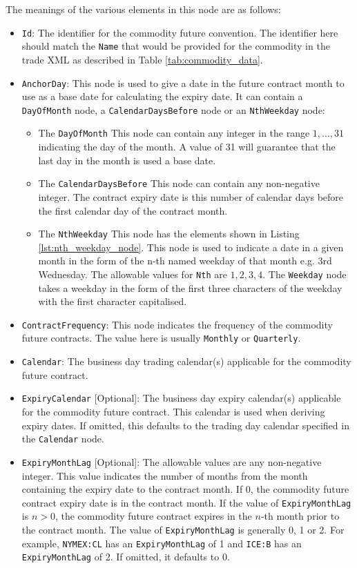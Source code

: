 The meanings of the various elements in this node are as follows:
\begin{itemize}
\item \lstinline!Id!: The identifier for the commodity future convention. The identifier here should match the \lstinline!Name! that would be provided for the commodity in the trade XML as described in Table \ref{tab:commodity_data}.
\item \lstinline!AnchorDay!: This node is used to give a date in the future contract month to use as a base date for calculating the expiry date. It can contain a \lstinline!DayOfMonth! node, a \lstinline!CalendarDaysBefore! node or an \lstinline!NthWeekday! node:
\begin{itemize}
\item The \lstinline!DayOfMonth! This node can contain any integer in the range $1,\ldots,31$ indicating the day of the month. A value of 31 will guarantee that the last day in the month is used a base date.
\item The \lstinline!CalendarDaysBefore! This node can contain any non-negative integer. The contract expiry date is this number of calendar days before the first calendar day of the contract month.
\item The \lstinline!NthWeekday! This node has the elements shown in Listing \ref{lst:nth_weekday_node}. This node is used to indicate a date in a given month in the form of the n-th named weekday of that month e.g. 3rd Wednesday. The allowable values for \lstinline!Nth! are ${1,2,3,4}$. The \lstinline!Weekday! node takes a weekday in the form of the first three characters of the weekday with the first character capitalised.
\end{itemize}
\item \lstinline!ContractFrequency!: This node indicates the frequency of the commodity future contracts. The value here is usually \lstinline!Monthly! or \lstinline!Quarterly!.
\item \lstinline!Calendar!: The business day trading calendar(s) applicable for the commodity future contract.
\item \lstinline!ExpiryCalendar! [Optional]: The business day expiry calendar(s) applicable for the commodity future contract. This calendar is used when deriving expiry dates. If omitted, this defaults to the trading day calendar specified in the \lstinline!Calendar! node.
\item \lstinline!ExpiryMonthLag! [Optional]: The allowable values are any non-negative integer. This value indicates the number of months from the month containing the expiry date to the contract month. If 0, the commodity future contract expiry date is in the contract month. If the value of \lstinline!ExpiryMonthLag! is $n > 0$, the commodity future contract expires in the $n$-th month prior to the contract month. The value of \lstinline!ExpiryMonthLag! is generally 0, 1 or 2. For example, \lstinline!NYMEX:CL! has an \lstinline!ExpiryMonthLag! of 1 and \lstinline!ICE:B! has an \lstinline!ExpiryMonthLag! of 2. If omitted, it defaults to 0.

\end{itemize}
